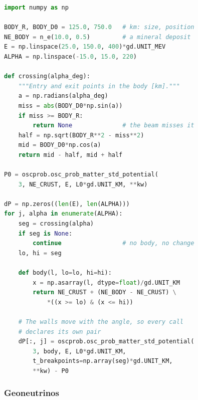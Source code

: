 \documentclass[final,5p,times,twocolumn,sort,compress]{elsarticle}
\makeatletter
\newcommand{\fig}{Fig.}
\DeclareRobustCommand{\_}{%
  \ifmmode\nfss@text{\textunderscore}\else\textunderscore\allowbreak\fi}
\newcommand{\figu}[1]{\fig~\ref{fig:#1}}
\makeatother
\begin{document}
\begin{lstlisting}[language=Python, caption={\textbf{A beam swept across a buried body.} The map of \figu{cavity_sweep}, which reuses {\tt n\_e}, {\tt NE\_CRUST}, {\tt L0}, and {\tt kw} from Listing~\ref{lst:cavity}. For each beam angle, {\tt crossing} finds where the chord enters and leaves the body. Each call uses these two points twice: as the edges of the body in the density profile, and as {\tt t\_breakpoints}. Angles at which the beam misses the body are skipped, since there the probability equals the crust-only {\tt P0}. A cavity is a density profile with two walls, whose positions are declared as breakpoints, so that no slab straddles a wall. See Sec.~\ref{sec:cavity} for details.}, label={lst:cavity_sweep}, float=tbp]
import numpy as np

BODY_R, BODY_D0 = 125.0, 750.0   # km: size, position
NE_BODY = n_e(10.0, 0.5)         # a mineral deposit
E = np.linspace(25.0, 150.0, 400)*gd.UNIT_MEV
ALPHA = np.linspace(-15.0, 15.0, 220)

def crossing(alpha_deg):
    """Entry and exit points in the body [km]."""
    a = np.radians(alpha_deg)
    miss = abs(BODY_D0*np.sin(a))
    if miss >= BODY_R:
        return None              # the beam misses it
    half = np.sqrt(BODY_R**2 - miss**2)
    mid = BODY_D0*np.cos(a)
    return mid - half, mid + half

P0 = oscprob.osc_prob_matter_std_potential(
    3, NE_CRUST, E, L0*gd.UNIT_KM, **kw)

dP = np.zeros((len(E), len(ALPHA)))
for j, alpha in enumerate(ALPHA):
    seg = crossing(alpha)
    if seg is None:
        continue                 # no body, no change
    lo, hi = seg

    def body(l, lo=lo, hi=hi):
        x = np.asarray(l, dtype=float)/gd.UNIT_KM
        return NE_CRUST + (NE_BODY - NE_CRUST) \
            *((x >= lo) & (x <= hi))

    # The walls move with the angle, so every call
    # declares its own pair
    dP[:, j] = oscprob.osc_prob_matter_std_potential(
        3, body, E, L0*gd.UNIT_KM,
        t_breakpoints=np.array(seg)*gd.UNIT_KM,
        **kw) - P0
\end{lstlisting}


\subsubsection{Geoneutrinos}
\label{sec:geoneutrinos}
\end{document}
